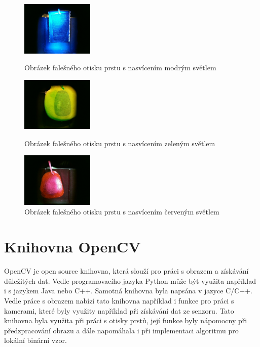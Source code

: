 \begin{figure}[!htbp]
  \begin{minipage}[b]{0.3\linewidth}
    \centering
    \includegraphics[width=130px]{obrazky-figures/fake23.jpg}
    \caption{Obrázek falešného otisku prstu s nasvícením modrým světlem}
  \end{minipage}
  \hspace{0.3cm}
  \begin{minipage}[b]{0.3\linewidth}
    \centering
    \includegraphics[width=130px]{obrazky-figures/fake64.jpg}
    \caption{Obrázek falešného otisku prstu s nasvícením zeleným světlem}
  \end{minipage}
  \hspace{0.3cm}
    \begin{minipage}[b]{0.3\linewidth}
    \centering
    \includegraphics[width=130px]{obrazky-figures/fake47.jpg}
    \caption{Obrázek falešného otisku prstu s nasvícením červeným světlem}
  \end{minipage}
\end{figure}

\section{Knihovna OpenCV}
OpenCV je open source knihovna, která slouží pro práci s obrazem a získávání důležitých dat. Vedle programovacího jazyka Python může být využita například i s jazykem Java nebo C++. Samotná knihovna byla napsána v jazyce C/C++. \cite{OpenCVLibrary} Vedle práce s obrazem nabízí tato knihovna například i funkce pro práci s kamerami, které byly využity například při získávání dat ze senzoru. Tato knihovna byla využita při práci s otisky prstů, její funkce byly nápomocny při předzpracování obrazu a dále napomáhala i při implementaci algoritmu pro lokální binární vzor.

